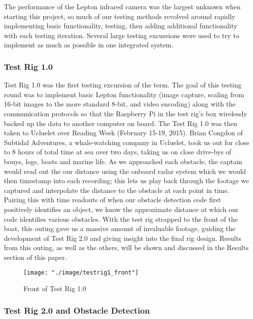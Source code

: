 The performance of the Lepton infrared camera was the largest unknown when starting this project, so much of our testing methods revolved around rapidly implementing basic functionality, testing, then adding additional functionality with each testing iteration. Several large testing excursions were used to try to implement as much as possible in one integrated system.


\subsubsection{\label{sec:discussion:testing:testrig1}Test Rig 1.0}

Test Rig 1.0 was the first testing excursion of the term. The goal of this testing round was to implement basic Lepton functionality (image capture, scaling from 16-bit images to the more standard 8-bit, and video encoding) along with the communication protocols so that the Raspberry Pi in the test rig's box wirelessly backed up the data to another computer on board. The Test Rig 1.0 was then taken to Ucluelet over Reading Week (February 15-19, 2015). Brian Congdon of Subtidal Adventures, a whale-watching company in Ucluelet, took us out for close to 8 hours of total time at sea over two days, taking us on close drive-bys of bouys, logs, boats and marine life. As we approached each obstacle, the captain would read out the our distance using the onboard radar system which we would then timestamp into each recording; this lets us play back through the footage we captured and interpolate the distance to the obstacle at each point in time. Pairing this with time readouts of when our obstacle detection code first positively identifies an object, we know the approximate distance at which our code identifies various obstacles. With the test rig strapped to the front of the boat, this outing gave us a massive amount of invaluable footage, guiding the development of Test Rig 2.0 and giving insight into the final rig design. Results from this outing, as well as the others, will be shown and discussed in the Results section of this paper.

\begin{figure}
\centering
\texttt{[image: "./image/testrig1\_front"]}
\caption{Front of Test Rig 1.0}
\label{fig:testrig1_testing}
\end{figure}


\subsubsection{\label{sec:discussion:testing:testrig2}Test Rig 2.0 and Obstacle Detection}

